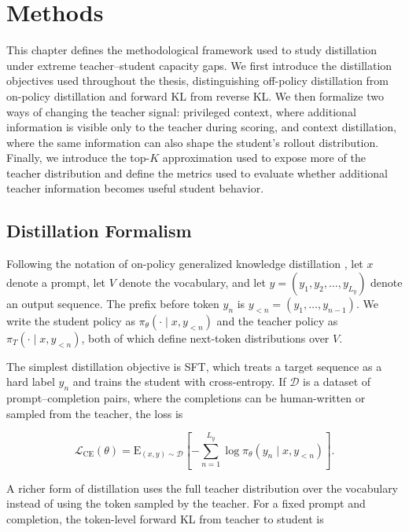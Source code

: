 \chapter{Methods}

This chapter defines the methodological framework used to study distillation under extreme teacher--student capacity gaps. We first introduce the distillation objectives used throughout the thesis, distinguishing off-policy distillation from on-policy distillation and forward KL from reverse KL. We then formalize two ways of changing the teacher signal: privileged context, where additional information is visible only to the teacher during scoring, and context distillation, where the same information can also shape the student's rollout distribution. Finally, we introduce the top-$K$ approximation used to expose more of the teacher distribution and define the metrics used to evaluate whether additional teacher information becomes useful student behavior.

\section{Distillation Formalism} \label{sec:distillation_formalism}

Following the notation of on-policy generalized knowledge distillation \cite{agarwalOnPolicyDistillationLanguage2024}, let $x$ denote a prompt, let $V$ denote the vocabulary, and let $y = (y_1, y_2, \ldots, y_{L_y})$ denote an output sequence. The prefix before token $y_n$ is $y_{<n} = (y_1, \ldots, y_{n-1})$. We write the student policy as $\pi_\theta(\cdot \mid x, y_{<n})$ and the teacher policy as $\pi_T(\cdot \mid x, y_{<n})$, both of which define next-token distributions over $V$.

The simplest distillation objective is SFT, which treats a target sequence as a hard label $y_n$ and trains the student with cross-entropy. If $\mathcal{D}$ is a dataset of prompt--completion pairs, where the completions can be human-written or sampled from the teacher, the loss is

\begin{equation}
\mathcal{L}_{\mathrm{CE}}(\theta)
= \mathrm{E}_{(x,y) \sim \mathcal{D}}
\left[
- \sum_{n=1}^{L_y}
\log \pi_\theta(y_n \mid x, y_{<n})
\right].
\label{eq:xentropy}
\end{equation}

A richer form of distillation uses the full teacher distribution over the vocabulary instead of using the token sampled by the teacher. For a fixed prompt and completion, the token-level forward KL from teacher to student is

